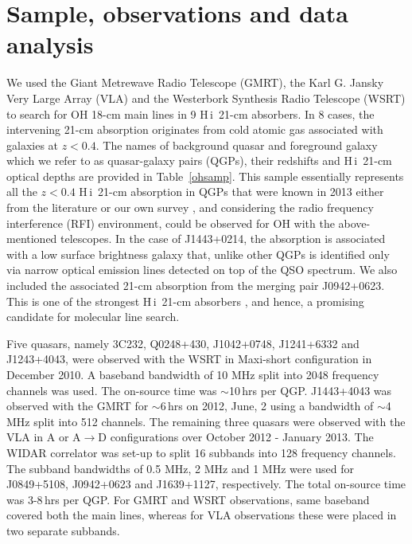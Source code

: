 \documentclass[iop,apjl,numberedappendix,appendixfloats,twocolappendix,revtex4]{emulateapj}
\newcommand{\hi}{\mbox{H\,{\sc i}}}
\begin{document}
\section{Sample, observations and data analysis}      
\label{sec:obs}   

We used the Giant Metrewave Radio Telescope (GMRT), the Karl G. Jansky Very Large Array (VLA) and the Westerbork Synthesis Radio Telescope (WSRT)  
to search for OH 18-cm main lines in 9 \hi\ 21-cm absorbers.  In 8 cases, the intervening 21-cm absorption originates from cold atomic gas associated with galaxies 
at $z<0.4$.  The names of background quasar and foreground galaxy which we refer to as quasar-galaxy pairs (QGPs), their redshifts and 
\hi\ 21-cm optical depths are provided in Table~\ref{ohsamp}. 
This sample essentially represents all the $z<0.4$ \hi\ 21-cm absorption in QGPs that were known in 2013 either from the literature or our own survey 
\citep[see][for the latest]{Dutta17}, and considering the radio frequency interference (RFI) environment, could be observed for OH 
with the above-mentioned telescopes. 
In the case of J1443+0214, the absorption is associated with a low surface brightness galaxy that, unlike other QGPs is identified only via narrow 
optical emission lines detected on top of the QSO spectrum.
We also included the associated 21-cm absorption from the merging pair J0942+0623.  This is one of the strongest \hi\ 21-cm absorbers 
\citep[$N$(\hi)$\sim$10$^{22}$\,cm$^{-2}$;][]{Srianand15}, and hence, a promising candidate for molecular line search.

Five quasars, namely 3C232, Q0248+430, J1042+0748, J1241+6332 and J1243+4043, were observed with the WSRT in Maxi-short configuration in 
December 2010.  
A baseband bandwidth of 10 MHz split into 2048 frequency channels was used.  The on-source time was $\sim$10\,hrs per QGP.  
J1443+4043 was observed with the GMRT for $\sim$6\,hrs  on 2012, June, 2 using a bandwidth of $\sim$4\,MHz split into 512 channels. 
The remaining three quasars were observed with the VLA in A or A$\rightarrow$D configurations over October 2012 - January 2013.  
The WIDAR correlator was set-up to split 16 subbands into 128 frequency channels. The subband bandwidths of 0.5 MHz, 2 MHz and 1 MHz were used for 
J0849+5108, J0942+0623 and J1639+1127, respectively.  The total on-source time was 3-8\,hrs per QGP. 
For GMRT and WSRT observations, same baseband covered both the main lines, whereas for VLA observations these were placed in two separate subbands.  
\end{document}
